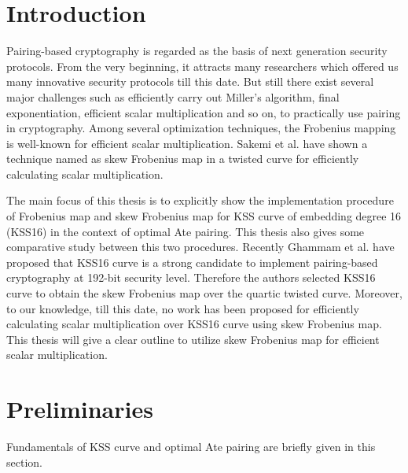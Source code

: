 \section{Introduction}
Pairing-based cryptography is regarded as the basis of next generation security protocols. From the very beginning, it attracts many researchers which offered us many innovative security protocols till this date. 
But still there exist several major challenges such as efficiently carry out Miller's algorithm, final exponentiation, efficient scalar multiplication and so on, to practically use pairing in cryptography. Among several optimization techniques,  the Frobenius mapping is well-known for efficient scalar multiplication. Sakemi et al. \cite{CANS:SNOKM08} have shown a technique named as skew Frobenius map in a twisted curve for efficiently calculating scalar multiplication.

The main focus of this thesis is to explicitly show the implementation procedure of  Frobenius map and skew Frobenius map for KSS curve of embedding degree 16 (KSS16) in the context of optimal Ate pairing. This thesis also gives some comparative study between this two procedures. Recently Ghammam et al. \cite{EPRINT:GhaFou16b} have proposed that KSS16 curve is a strong candidate to implement pairing-based cryptography at 192-bit security level. Therefore the authors selected KSS16 curve to obtain the skew Frobenius map over the quartic twisted curve. Moreover, to our knowledge, till this date, no work has been proposed for efficiently calculating scalar multiplication over KSS16 curve using skew Frobenius map. This thesis will give a clear outline to utilize skew Frobenius map for efficient scalar multiplication.

\section{Preliminaries}
Fundamentals of KSS curve and  optimal Ate pairing are briefly given in this section.
